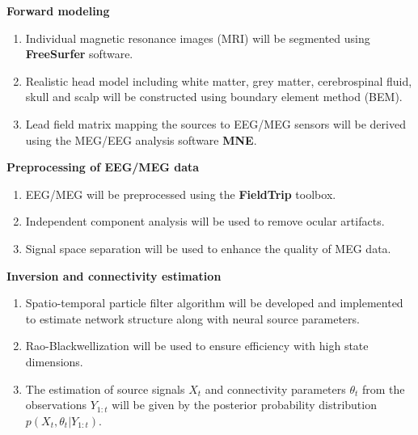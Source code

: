 \documentclass[a0paper,portrait]{baposter}
\begin{document}
\begin{poster}
{\begin{description}
\item \textbf{Forward modeling}

\begin{enumerate}
\item Individual magnetic resonance images (MRI) will be segmented using \textbf{FreeSurfer} software.
\item Realistic head model including white matter, grey matter, cerebrospinal fluid, skull and scalp will be constructed using boundary element method (BEM).
\item Lead field matrix mapping the sources to EEG/MEG sensors will be derived using the MEG/EEG analysis software \textbf{MNE}.
\end{enumerate}

\item \textbf{Preprocessing of EEG/MEG data}
\begin{enumerate}
\item EEG/MEG will be preprocessed using the \textbf{FieldTrip} toolbox.
\item Independent component analysis will be used to remove ocular artifacts.
\item Signal space separation will be used to enhance the quality of MEG data.
\end{enumerate}

\item \textbf{Inversion and connectivity estimation}
\begin{enumerate}
\item Spatio-temporal particle filter algorithm will be developed and implemented  to estimate network structure along with neural source parameters.
\item Rao-Blackwellization will be used to ensure efficiency with high state dimensions.
\item The estimation of source signals $X_t$ and connectivity parameters $\theta_t$ from the observations $Y_{1:t}$ will be given by the posterior probability distribution $p(X_t, \theta_t | Y_{1:t})$.
\end{enumerate}

\end{description}
}



\end{poster}
\end{document}
